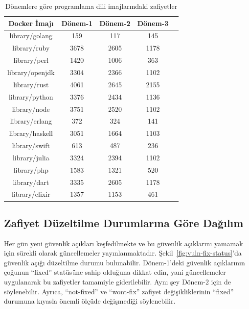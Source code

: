 \begin{table}
    \centering
    \begin{tabular}{ |c|c|c|c|c| }
        \hline
        Docker İmajı & Dönem-1 & Dönem-2 & Dönem-3 \\
        \hline
        library/golang  &  159 &  117 &  145 \\
        library/ruby    & 3678 & 2605 & 1178 \\
        library/perl    & 1420 & 1006 &  363 \\
        library/openjdk & 3304 & 2366 & 1102 \\
        library/rust    & 4061 & 2645 & 2155 \\
        library/python  & 3376 & 2434 & 1136 \\
        library/node    & 3751 & 2520 & 1102 \\
        library/erlang  &  372 &  324 &  141 \\
        library/haskell & 3051 & 1664 & 1103 \\
        library/swift   &  613 &  487 &  236 \\
        library/julia   & 3324 & 2394 & 1102 \\
        library/php     & 1583 & 1321 &  520 \\
        library/dart    & 3335 & 2605 & 1178 \\
        library/elixir  & 1357 & 1153 &  461 \\
        \hline
    \end{tabular}
    \caption{Dönemlere göre programlama dili imajlarındaki zafiyetler}\label{tab:proglang-by-periods}
\end{table}

\subsection{Zafiyet Düzeltilme Durumlarına Göre Dağılım}\label{subsec:fix-status}

Her gün yeni güvenlik açıkları keşfedilmekte ve bu güvenlik açıklarını yamamak için sürekli olarak güncellemeler yayınlanmaktadır. Şekil~\ref{fig:vuln-fix-status}'da güvenlik açığı düzeltilme durumu bulunabilir. Dönem-1'deki güvenlik açıklarının çoğunun ``fixed'' statüsüne sahip olduğuna dikkat edin, yani güncellemeler uygulanarak bu zafiyetler tamamiyle giderilebilir. Aynı şey Dönem-2 için de söylenebilir. Ayrıca, ``not-fixed'' ve ``wont-fix'' zafiyet değişikliklerinin ``fixed'' durumuna kıyasla önemli ölçüde değişmediği söylenebilir.

